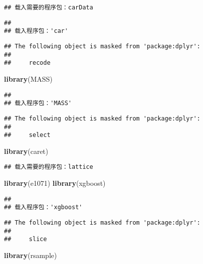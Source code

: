 \documentclass[
]{article}
\newenvironment{Shaded}{\begin{snugshade}}{\end{snugshade}}
\newcommand{\FunctionTok}[1]{\textcolor[rgb]{0.13,0.29,0.53}{\textbf{#1}}}
\newcommand{\NormalTok}[1]{#1}
\begin{document}
\begin{verbatim}
## 载入需要的程序包：carData
\end{verbatim}

\begin{verbatim}
## 
## 载入程序包：'car'
\end{verbatim}

\begin{verbatim}
## The following object is masked from 'package:dplyr':
## 
##     recode
\end{verbatim}

\begin{Shaded}
\begin{Highlighting}[]
\FunctionTok{library}\NormalTok{(MASS)}
\end{Highlighting}
\end{Shaded}

\begin{verbatim}
## 
## 载入程序包：'MASS'
\end{verbatim}

\begin{verbatim}
## The following object is masked from 'package:dplyr':
## 
##     select
\end{verbatim}

\begin{Shaded}
\begin{Highlighting}[]
\FunctionTok{library}\NormalTok{(caret)}
\end{Highlighting}
\end{Shaded}

\begin{verbatim}
## 载入需要的程序包：lattice
\end{verbatim}

\begin{Shaded}
\begin{Highlighting}[]
\FunctionTok{library}\NormalTok{(e1071)}
\FunctionTok{library}\NormalTok{(xgboost)}
\end{Highlighting}
\end{Shaded}

\begin{verbatim}
## 
## 载入程序包：'xgboost'
\end{verbatim}

\begin{verbatim}
## The following object is masked from 'package:dplyr':
## 
##     slice
\end{verbatim}

\begin{Shaded}
\begin{Highlighting}[]
\FunctionTok{library}\NormalTok{(rsample)}
\end{Highlighting}
\end{Shaded}
\end{document}
